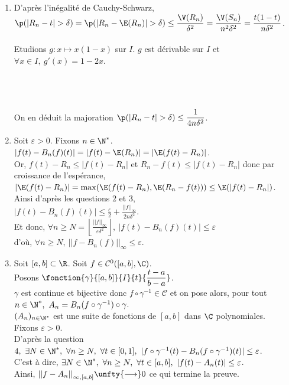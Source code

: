 \documentclass[8pt]{book}
\begin{document}
\begin{enumerate}
\begin{align*}
			&\leq \displaystyle\frac{\varepsilon}{2}+2{||f||}_\infty\p\left(|t-R_n|>\delta\right)
		\end{align*}
		\item D'après l'inégalité de Cauchy-Schwarz,\\
		$\p(|R_n-t|>\delta)=\p(|R_n-\E(R_n)|>\delta)\leq \displaystyle\frac{\V(R_n)}{\delta^2}=\frac{\V(S_n)}{n^2\delta^2}=\frac{t(1-t)}{n\delta^2}$.\\\\
		Etudions $g:x\mapsto x(1-x)$ sur $I$. $g$ est dérivable sur $I$ et $\forall x\in I,\ g'(x)=1-2x$.\\\\
		\\\\
		On en déduit la majoration $\p(|R_n-t|>\delta)\leq \displaystyle\frac{1}{4n\delta^2}$.
		\item Soit $\varepsilon>0$. Fixons $n\in \N^*$.\\
		$|f(t)-B_n(f)(t)|=|f(t)-\E(R_n)|=|\E(f(t)-R_n)|$.\\
		Or, $f(t)-R_n\leq |f(t)-R_n|$ et $R_n-f(t)\leq |f(t)-R_n|$ donc par croissance de l'espérance,\\
		$|\E(f(t)-R_n)|=\max(\E(f(t)-R_n),\E(R_n-f(t)))\leq \E(|f(t)-R_n|)$.\\
		Ainsi d'après les questions $2$ et $3$,\\
		$|f(t)-B_n(f)(t)|\leq \displaystyle\frac{\varepsilon}{2}+\frac{{||f||}_\infty}{2n\delta^2}$.\\
		Et donc, $\forall n\geq N=\left\lfloor \displaystyle\frac{{||f||}_\infty}{\varepsilon\delta^2}\right\rfloor,\ |f(t)-B_n(f)(t)|\leq \varepsilon$\\
		d'où, $\forall n\geq N,\ {||f-B_n(f)||}_\infty\leq \varepsilon$.
		\item Soit $[a,b]\subset \R$. Soit $f\in\mathcal{C}^0([a,b],\C)$.\\
		Posons $\fonction{\gamma}{[a,b]}{I}{t}{\displaystyle\frac{t-a}{b-a}}$.\\ $\gamma$ est continue et bijective donc $f\circ\gamma^{-1}\in \mathcal{C}$ et on pose alors, pour tout $n\in \N^*,\ A_n=B_n(f\circ\gamma^{-1})\circ\gamma$.\\
		$(A_n)_{n\in \N^*}$ est une suite de fonctions de $[a,b]$ dans $\C$ polynomiales.\\
		Fixons $\varepsilon>0$.\\
		D'après la question $4,\ \exists N\in \N^*,\ \forall n\geq N,\ \forall t\in [0,1],\ |f\circ\gamma^{-1}(t)-B_n(f\circ\gamma^{-1})(t)|\leq \varepsilon$.\\
		C'est à dire, $\exists N\in \N^*,\ \forall n\geq N,\ \forall t\in [a,b],\ |f(t)-A_n(t)|\leq \varepsilon$.\\
		Ainsi, ${||f-A_n||}_{\infty,[a,b]}\unfty{\longrightarrow}0$ ce qui termine la preuve.
	\end{enumerate}
	
\end{document}
